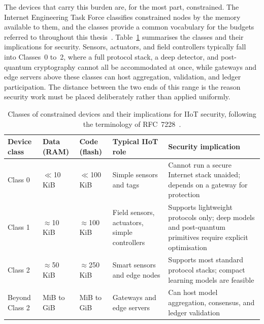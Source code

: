 The devices that carry this burden are, for the most part, constrained. The
Internet Engineering Task Force classifies constrained nodes by the memory
available to them, and the classes provide a common vocabulary for the budgets
referred to throughout this thesis~\cite{rfc7228}. Table~\ref{tab:device-classes}
summarises the classes and their implications for security. Sensors, actuators,
and field controllers typically fall into Classes~0 to~2, where a full protocol
stack, a deep detector, and post-quantum cryptography cannot all be
accommodated at once, while gateways and edge servers above these classes can
host aggregation, validation, and ledger participation. The distance between the
two ends of this range is the reason security work must be placed deliberately
rather than applied uniformly.

\begin{table}[!htbp]
\centering
\footnotesize
\setlength{\tabcolsep}{4pt}
\renewcommand{\arraystretch}{1.35}
\caption{Classes of constrained devices and their implications for IIoT security, following the terminology of RFC~7228~\cite{rfc7228}.}
\label{tab:device-classes}
\begin{tabularx}{\textwidth}{@{}
    >{\raggedright\arraybackslash}p{2.0cm}
    >{\raggedright\arraybackslash}p{1.7cm}
    >{\raggedright\arraybackslash}p{1.7cm}
    >{\raggedright\arraybackslash}p{3.0cm}
    >{\raggedright\arraybackslash}X@{}}
\toprule
\textbf{Device class} & \textbf{Data (RAM)} & \textbf{Code (flash)} & \textbf{Typical IIoT role} & \textbf{Security implication} \\
\midrule
Class 0 & $\ll$10 KiB & $\ll$100 KiB & Simple sensors and tags & Cannot run a secure Internet stack unaided; depends on a gateway for protection \\
\addlinespace
Class 1 & $\approx$10 KiB & $\approx$100 KiB & Field sensors, actuators, simple controllers & Supports lightweight protocols only; deep models and post-quantum primitives require explicit optimisation \\
\addlinespace
Class 2 & $\approx$50 KiB & $\approx$250 KiB & Smart sensors and edge nodes & Supports most standard protocol stacks; compact learning models are feasible \\
\addlinespace
Beyond Class 2 & MiB to GiB & MiB to GiB & Gateways and edge servers & Can host model aggregation, consensus, and ledger validation \\
\bottomrule
\end{tabularx}
\end{table}

